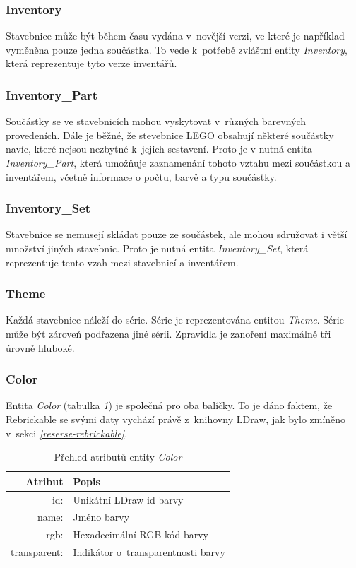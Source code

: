 \subsubsection*{Inventory}
Stavebnice může být během času vydána v~novější verzi, ve které je například vyměněna pouze jedna součástka. To vede k~potřebě zvláštní entity \textit{Inventory}, která reprezentuje tyto verze inventářů. 

\subsubsection*{Inventory\_Part} 
Součástky se ve stavebnicích mohou vyskytovat v~různých barevných provedeních. Dále je běžné, že stevebnice LEGO obsahují některé součástky navíc, které nejsou nezbytné k~jejich sestavení. Proto je v nutná entita \textit{Inventory\_Part}, která umožňuje zaznamenání tohoto vztahu mezi součástkou a inventářem, včetně informace o počtu, barvě a typu součástky.

\subsubsection*{Inventory\_Set}
Stavebnice se nemusejí skládat pouze ze součástek, ale mohou sdružovat i větší množství jiných stavebnic. Proto je nutná entita \textit{Inventory\_Set}, která reprezentuje tento vzah mezi stavebnicí a inventářem.

\subsubsection*{Theme}
Každá stavebnice náleží do série. Série je reprezentována entitou \textit{Theme}. Série může být zároveň podřazena jiné sérii. Zpravidla je zanoření maximálně tři úrovně hluboké.

\subsubsection*{Color} 
Entita \textit{Color} (tabulka \emph{\ref{table:entity:color}}) je společná pro oba balíčky. To je dáno faktem, že Rebrickable se svými daty vychází právě z~knihovny LDraw, jak bylo zmíněno v~sekci \emph{\ref{reserse-rebrickable}}.

\begin{table}[th!]
  \centering
  \caption{Přehled atributů entity \textit{Color}}
  \label{table:entity:color}
  \begin{tabularx}{\textwidth}{@{}rX@{}}
  \toprule
  Atribut & Popis
  \\ \midrule
  id: & Unikátní LDraw id barvy \autocite{ldraw:colors}
  \\
  name: & Jméno barvy
  \\
  rgb: & Hexadecimální \gls{RGB} kód barvy 
  \\
  transparent: & Indikátor o~transparentnosti barvy
  \\
  \bottomrule
  \end{tabularx}
\end{table}

